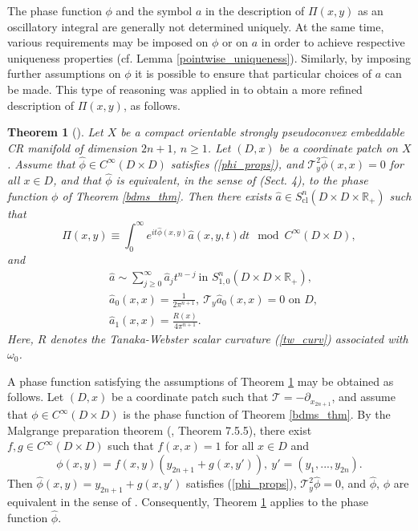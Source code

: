 \documentclass{article}
\newtheorem{theorem}{Theorem}[section]
\newcommand{\RR}{\mathbb R}
\newcommand{\mct}{\mathcal T}
\DeclareMathOperator{\cl}{cl}
\begin{document}
%
%
%
The phase function $\phi$ and the symbol $a$ in the description of $\Pi(x,y)$ as an oscillatory integral are generally not determined uniquely. At the same time, various requirements may be imposed on $\phi$ or on $a$ in order to achieve respective uniqueness properties (cf. Lemma \ref{pointwise_uniqueness}). Similarly, by imposing further assumptions on $\phi$ it is possible to ensure that particular choices of $a$ can be made. This type of reasoning was applied in \cite{hsiao_shen} to obtain a more refined description of $\Pi(x,y)$, as follows.
%
%
%
\begin{theorem}[\cite{hsiao_shen}]\label{hsiao_shen_thm_intro} Let $X$ be a compact orientable strongly pseudoconvex embeddable CR manifold of dimension $2n+1$, $n \ge 1$. Let $(D,x)$ be a coordinate patch on $X$. Assume that $\hat \phi \in C^\infty(D \times D)$ satisfies (\ref{phi_props}), and $\mct_y^2 \hat \phi(x,x) = 0$ for all $x \in D$, and that $\hat \phi$ is equivalent, in the sense of \cite{ms} (Sect. 4), to the phase function $\phi$ of Theorem \ref{bdms_thm}. Then there exists $\hat a \in S^n_{\cl}(D \times D \times \RR_+)$ such that $$\Pi(x,y) \equiv \int_0^\infty e^{it \hat \phi(x,y)} \hat a(x,y,t)dt \mod C^\infty(D \times D),$$
and $$\begin{aligned} &\hat a \sim \sum_{j \ge 0}^\infty \hat a_j t^{n-j}\ \text{in } S^n_{1,0}(D \times D \times \RR_+),\\ &\hat a_0(x,x) = \frac 1 {2\pi^{n+1}},\ \mct_y \hat a_0(x,x) = 0\text{ on }D,\\ &\hat a_1(x,x) = \frac{R(x)}{4\pi^{n+1}}. \end{aligned}$$
Here, $R$ denotes the \textit{Tanaka-Webster scalar curvature} (\ref{tw_curv}) associated with $\omega_0$.\end{theorem}
%
A phase function satisfying the assumptions of Theorem \ref{hsiao_shen_thm_intro} may be obtained as follows. Let $(D,x)$ be a coordinate patch such that $\mct = -\partial_{x_{2n+1}}$, and assume that $\phi \in C^\infty(D \times D)$ is the phase function of Theorem \ref{bdms_thm}. By the Malgrange preparation theorem (\cite{hormander1}, Theorem 7.5.5), there exist $f, g \in C^\infty(D \times D)$ such that $f(x,x) = 1$ for all $x \in D$ and $$\phi(x,y) = f(x,y)(y_{2n+1} + g(x,y')),\ y' = (y_1, ..., y_{2n}).$$
Then $\hat \phi(x,y) = y_{2n+1} + g(x,y')$ satisfies (\ref{phi_props}), $\mct_y^2 \hat \phi = 0$, and $\hat \phi$, $\phi$ are equivalent in the sense of \cite{ms}. Consequently, Theorem \ref{hsiao_shen_thm_intro} applies to the phase function $\hat \phi$.
\end{document}

